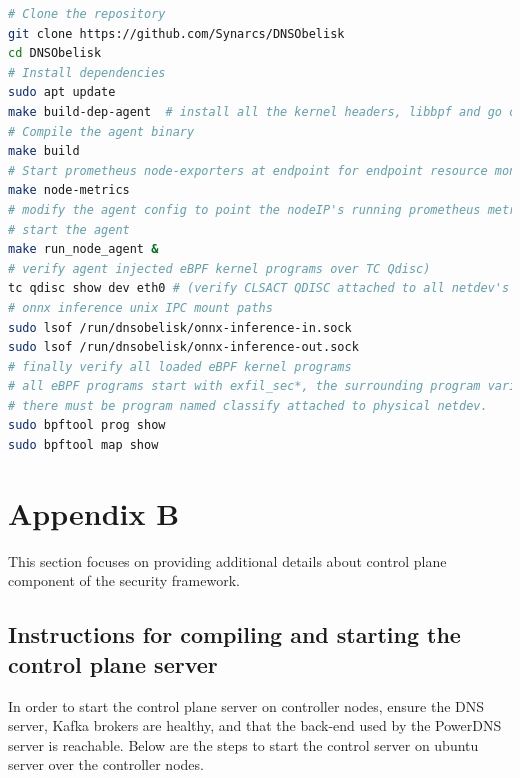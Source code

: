 \documentclass [11pt, proquest] {uwthesis}[2020/02/24]
\begin{document}
{\footnotesize
\begin{lstlisting}[language=bash, 
    caption={Installation steps for eBPF agent at endpoint in data plane}, 
    label={lst:install-steps-dp},
    aboveskip=0.5em, 
    belowskip=0.5em
]
# Clone the repository
git clone https://github.com/Synarcs/DNSObelisk
cd DNSObelisk
# Install dependencies
sudo apt update 
make build-dep-agent  # install all the kernel headers, libbpf and go compiler and packages
# Compile the agent binary 
make build 
# Start prometheus node-exporters at endpoint for endpoint resource monitoring 
make node-metrics
# modify the agent config to point the nodeIP's running prometheus metric server, kafka brokers, grafana visualization server (node_agent/config.yaml).
# start the agent
make run_node_agent &
# verify agent injected eBPF kernel programs over TC Qdisc)
tc qdisc show dev eth0 # (verify CLSACT QDISC attached to all netdev's and bridge interfaces).
# onnx inference unix IPC mount paths 
sudo lsof /run/dnsobelisk/onnx-inference-in.sock  
sudo lsof /run/dnsobelisk/onnx-inference-out.sock
# finally verify all loaded eBPF kernel programs 
# all eBPF programs start with exfil_sec*, the surrounding program varies based on number of netdev's
# there must be program named classify attached to physical netdev.
sudo bpftool prog show  
sudo bpftool map show
\end{lstlisting}
}



\section{Appendix B}
This section focuses on providing additional details about control plane component of the security framework. 

\subsection{Instructions for compiling and starting the control plane server}
In order to start the control plane server on controller nodes, ensure the DNS server, Kafka brokers are healthy, and that the back-end used by the PowerDNS server is reachable. Below are the steps to start the control server on ubuntu server over the controller nodes.
\end{document}
